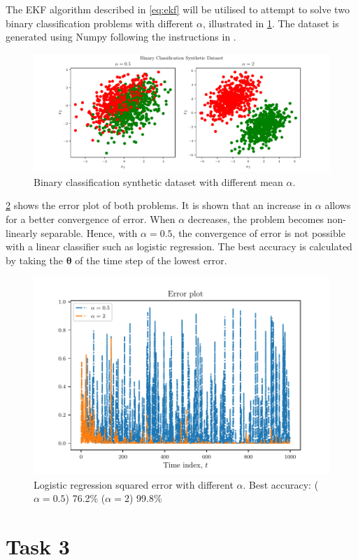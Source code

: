 \documentclass{article}
\begin{document}
The EKF algorithm described in \cref{eq:ekf} will be utilised to attempt to solve two binary classification problems with different $\alpha$, illustrated in \cref{fig:dataset}. The dataset is generated using Numpy following the instructions in \cite{lab3}.

\begin{figure}
    \centering
    \includegraphics[width=\textwidth]{Figures/dataset.pdf}
    \caption{Binary classification synthetic dataset with different mean $\alpha$.}
    \label{fig:dataset}
\end{figure}

\cref{fig:error-lr} shows the error plot of both problems. It is shown that an increase in $\alpha$ allows for a better convergence of error. When $\alpha$ decreases, the problem becomes non-linearly separable. Hence, with $\alpha = 0.5$, the convergence of error is not possible with a linear classifier such as logistic regression. The best accuracy is calculated by taking the $\pmb{\theta}$ of the time step of the lowest error.


\begin{figure}
    \centering
    \includegraphics[width=.7\textwidth]{Figures/error_lr.pdf}
    \caption{Logistic regression squared error with different $\alpha$. Best accuracy: ($\alpha = 0.5$) 76.2\% ($\alpha = 2$) 99.8\%}
    \label{fig:error-lr}
\end{figure}


\section{Task 3}

\printbibliography
\end{document}

